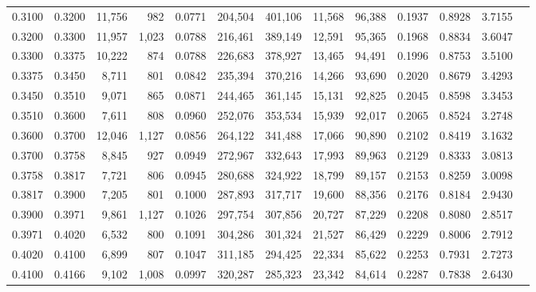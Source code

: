 \begin{tabular}{rrrrrrrrrrrrr}
0.3100 & 0.3200 & 11,756 &   982 &                                     0.0771 & 204,504 & 401,106 &  11,568 &  96,388 & 0.1937 & 0.8928 & 3.7155 \\
0.3200 & 0.3300 & 11,957 & 1,023 &                                     0.0788 & 216,461 & 389,149 &  12,591 &  95,365 & 0.1968 & 0.8834 & 3.6047 \\
0.3300 & 0.3375 & 10,222 &   874 &                                     0.0788 & 226,683 & 378,927 &  13,465 &  94,491 & 0.1996 & 0.8753 & 3.5100 \\
0.3375 & 0.3450 &  8,711 &   801 &                                     0.0842 & 235,394 & 370,216 &  14,266 &  93,690 & 0.2020 & 0.8679 & 3.4293 \\
0.3450 & 0.3510 &  9,071 &   865 &                                     0.0871 & 244,465 & 361,145 &  15,131 &  92,825 & 0.2045 & 0.8598 & 3.3453 \\
0.3510 & 0.3600 &  7,611 &   808 &                                     0.0960 & 252,076 & 353,534 &  15,939 &  92,017 & 0.2065 & 0.8524 & 3.2748 \\
0.3600 & 0.3700 & 12,046 & 1,127 &                                     0.0856 & 264,122 & 341,488 &  17,066 &  90,890 & 0.2102 & 0.8419 & 3.1632 \\
0.3700 & 0.3758 &  8,845 &   927 &                                     0.0949 & 272,967 & 332,643 &  17,993 &  89,963 & 0.2129 & 0.8333 & 3.0813 \\
0.3758 & 0.3817 &  7,721 &   806 &                                     0.0945 & 280,688 & 324,922 &  18,799 &  89,157 & 0.2153 & 0.8259 & 3.0098 \\
0.3817 & 0.3900 &  7,205 &   801 &                                     0.1000 & 287,893 & 317,717 &  19,600 &  88,356 & 0.2176 & 0.8184 & 2.9430 \\
0.3900 & 0.3971 &  9,861 & 1,127 &                                     0.1026 & 297,754 & 307,856 &  20,727 &  87,229 & 0.2208 & 0.8080 & 2.8517 \\
0.3971 & 0.4020 &  6,532 &   800 &                                     0.1091 & 304,286 & 301,324 &  21,527 &  86,429 & 0.2229 & 0.8006 & 2.7912 \\
0.4020 & 0.4100 &  6,899 &   807 &                                     0.1047 & 311,185 & 294,425 &  22,334 &  85,622 & 0.2253 & 0.7931 & 2.7273 \\
0.4100 & 0.4166 &  9,102 & 1,008 &                                     0.0997 & 320,287 & 285,323 &  23,342 &  84,614 & 0.2287 & 0.7838 & 2.6430 \\

\end{tabular}
